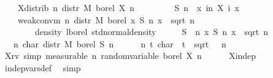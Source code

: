 \documentclass{svjour3}
\begin{document}
{\begin{isabellebody}
\ \ \ \ X{\isacharunderscore}distrib{\isacharcolon}\ {\isachardoublequoteopen}{\isasymAnd}n{\isachardot}\ distr\ M\ borel\ {\isacharparenleft}X\ n{\isacharparenright}\ {\isacharequal}\ {\isasymmu}{\isachardoublequoteclose}\isanewline
\ \ \isanewline
\ \ \ \ {\isachardoublequoteopen}S\ n\ {\isasymequiv}\ {\isasymlambda}x{\isachardot}\ {\isasymSum}i{\isacharless}n{\isachardot}\ X\ i\ x{\isachardoublequoteclose}\isanewline
\ \ \isanewline
\ \ \ \ {\isachardoublequoteopen}weak{\isacharunderscore}conv{\isacharunderscore}m\ {\isacharparenleft}{\isasymlambda}n{\isachardot}\ distr\ M\ borel\ {\isacharparenleft}{\isasymlambda}x{\isachardot}\ S\ n\ x\ {\isacharslash}\ sqrt\ {\isacharparenleft}n\ {\isacharasterisk}\ {\isasymsigma}\ \isanewline
\ \ \ \ \ \ \ \ {\isacharparenleft}density\ lborel\ std{\isacharunderscore}normal{\isacharunderscore}density{\isacharparenright}{\isachardoublequoteclose}\isanewline
{}\isamarkupfalse%
\ {\isacharminus}\isanewline
\ \ \isamarkupfalse%
\ S{\isacharprime}\ {\isasymequiv}\ {\isachardoublequoteopen}{\isasymlambda}n\ x{\isachardot}\ S\ n\ x\ {\isacharslash}\ sqrt\ {\isacharparenleft}n\ {\isacharasterisk}\ {\isasymsigma}\isanewline
\ \ \isamarkupfalse%
\ {\isasymphi}\ {\isasymequiv}\ {\isachardoublequoteopen}{\isasymlambda}n{\isachardot}\ char\ {\isacharparenleft}distr\ M\ borel\ {\isacharparenleft}S{\isacharprime}\ n{\isacharparenright}{\isacharparenright}{\isachardoublequoteclose}\isanewline
\ \ \isamarkupfalse%
\ {\isasympsi}\ {\isasymequiv}\ {\isachardoublequoteopen}{\isasymlambda}n\ t{\isachardot}\ char\ {\isasymmu}\ {\isacharparenleft}t\ {\isacharslash}\ sqrt\ {\isacharparenleft}{\isasymsigma}\ {\isacharasterisk}\ n{\isacharparenright}{\isacharparenright}{\isachardoublequoteclose}\isanewline
\isanewline
\ \ \isamarkupfalse%
\ X{\isacharunderscore}rv\ {\isacharbrackleft}simp{\isacharcomma}\ measurable{\isacharbrackright}{\isacharcolon}\ {\isachardoublequoteopen}{\isasymAnd}n{\isachardot}\ random{\isacharunderscore}variable\ borel\ {\isacharparenleft}X\ n{\isacharparenright}{\isachardoublequoteclose}\isanewline
\ \ \ \ \isamarkupfalse%
\ X{\isacharunderscore}indep\ \isamarkupfalse%
\ indep{\isacharunderscore}vars{\isacharunderscore}def{}\ \isamarkupfalse%
\ simp\isanewline

\end{isabellebody}}
\end{document}
